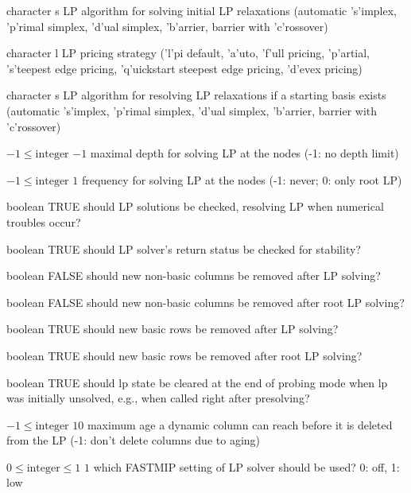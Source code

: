 %
{character}%
{s}%
{LP algorithm for solving initial LP relaxations (automatic 's'implex, 'p'rimal simplex, 'd'ual simplex, 'b'arrier, barrier with 'c'rossover)}%
{}

%
{character}%
{l}%
{LP pricing strategy ('l'pi default, 'a'uto, 'f'ull pricing, 'p'artial, 's'teepest edge pricing, 'q'uickstart steepest edge pricing, 'd'evex pricing)}%
{}

%
{character}%
{s}%
{LP algorithm for resolving LP relaxations if a starting basis exists (automatic 's'implex, 'p'rimal simplex, 'd'ual simplex, 'b'arrier, barrier with 'c'rossover)}%
{}

%
{$-1\leq\textrm{integer}$}%
{$-1$}%
{maximal depth for solving LP at the nodes (-1: no depth limit)}%
{}

%
{$-1\leq\textrm{integer}$}%
{$1$}%
{frequency for solving LP at the nodes (-1: never; 0: only root LP)}%
{}

%
{boolean}%
{TRUE}%
{should LP solutions be checked, resolving LP when numerical troubles occur?}%
{}

%
{boolean}%
{TRUE}%
{should LP solver's return status be checked for stability?}%
{}

%
{boolean}%
{FALSE}%
{should new non-basic columns be removed after LP solving?}%
{}

%
{boolean}%
{FALSE}%
{should new non-basic columns be removed after root LP solving?}%
{}

%
{boolean}%
{TRUE}%
{should new basic rows be removed after LP solving?}%
{}

%
{boolean}%
{TRUE}%
{should new basic rows be removed after root LP solving?}%
{}

%
{boolean}%
{TRUE}%
{should lp state be cleared at the end of probing mode when lp was initially unsolved, e.g., when called right after presolving?}%
{}

%
{$-1\leq\textrm{integer}$}%
{$10$}%
{maximum age a dynamic column can reach before it is deleted from the LP (-1: don't delete columns due to aging)}%
{}

%
{$0\leq\textrm{integer}\leq1$}%
{$1$}%
{which FASTMIP setting of LP solver should be used? 0: off, 1: low}%
{}

